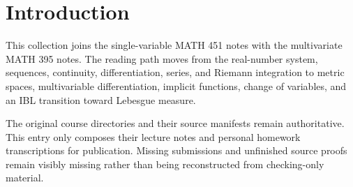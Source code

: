 \chapter{Introduction}

This collection joins the single-variable MATH 451 notes with the multivariate MATH 395 notes. The reading path moves from the real-number system, sequences, continuity, differentiation, series, and Riemann integration to metric spaces, multivariable differentiation, implicit functions, change of variables, and an IBL transition toward Lebesgue measure.

The original course directories and their source manifests remain authoritative. This entry only composes their lecture notes and personal homework transcriptions for publication. Missing submissions and unfinished source proofs remain visibly missing rather than being reconstructed from checking-only material.
